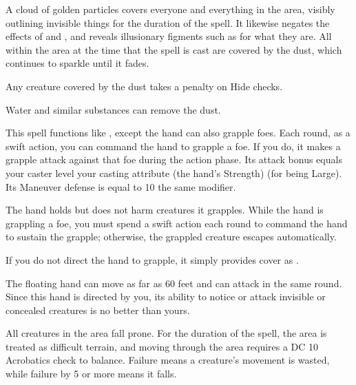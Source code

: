 \spellrng{\rngmed}
\spelldur{\durshort}
\begin{spelleffect}
  A cloud of golden particles covers everyone and everything in the area, visibly outlining invisible things for the duration of the spell. It likewise negates the effects of  and , and reveals illusionary figments such as  for what they are. All within the area at the time that the spell is cast are covered by the dust, which continues to sparkle until it fades.
  \par Any creature covered by the dust takes a  penalty on Hide checks.
\end{spelleffect}
\begin{spelleffect}
  Water and similar substances can remove the dust.
\end{spelleffect}

\begin{spelleffect}
  This spell functions like , except the hand can also grapple foes. Each round, as a swift action, you can command the hand to grapple a foe. If you do, it makes a grapple attack against that foe during the action phase. Its attack bonus equals your caster level \add your casting attribute (the hand's Strength)  (for being Large). Its Maneuver defense is equal to 10 \add the same modifier.
  \par The hand holds but does not harm creatures it grapples. While the hand is grappling a foe, you must spend a swift action each round to command the hand to sustain the grapple; otherwise, the grappled creature escapes automatically.
  \par If you do not direct the hand to grapple, it simply provides cover as .
\end{spelleffect}
\begin{spellnotes}
  The floating hand can move as far as 60 feet and can attack in the same round. Since this hand is directed by you, its ability to notice or attack invisible or concealed creatures is no better than yours.
\end{spellnotes}

\spellrng{\rngclose}
\begin{spelleffect}
    All creatures in the area fall prone. For the duration of the spell, the area is treated as difficult terrain, and moving through the area requires a DC 10 Acrobatics check to balance. Failure means a creature's movement is wasted, while failure by 5 or more means it falls.
\end{spelleffect}

